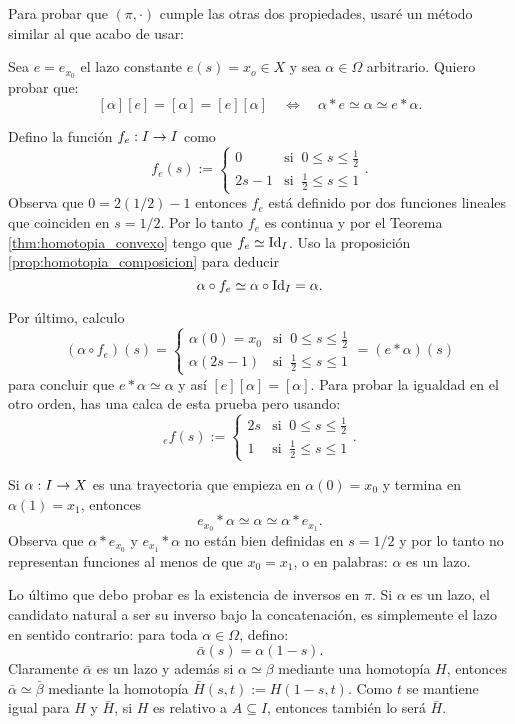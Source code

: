 \documentclass[../../topologia_algebraica]{subfiles}
\begin{document}
Para probar que $(\pi,\cdot)$ cumple las otras dos propiedades, usar\'e un m\'etodo similar
al que acabo de usar:

Sea $e=e_{x_0}$ el lazo constante $e(s)=x_o\in X$ y sea $\alpha\in\Omega$ arbitrario. Quiero
probar que:
\begin{equation}
  \label{eq:existencia_neutro}
  [\alpha][e]=[\alpha]=[e][\alpha] \quad\iff\quad \alpha*e\simeq \alpha \simeq e*\alpha.
\end{equation}

Defino la funci\'on $f_e:I\rightarrow I$ como
\[
  f_e(s):=
  \begin{cases}
    0 & \text{si}\;\; 0\leq s\leq\frac{1}{2}\\
    2s-1 & \text{si}\;\; \frac{1}{2}\leq s\leq 1
  \end{cases}.
\]
Observa que $0=2(1/2)-1$ entonces $f_e$ est\'a definido por dos funciones lineales que
coinciden en $s=1/2$. Por lo tanto $f_e$ es continua y por el Teorema \ref{thm:homotopia_convexo}
tengo que $f_e\simeq \text{Id}_I$. Uso la proposici\'on \ref{prop:homotopia_composicion} para deducir
\[
  \alpha\circ f_e \simeq \alpha\circ\text{Id}_I=\alpha.
\]

Por \'ultimo, calculo
\[
  (\alpha\circ f_e)(s)=
    \begin{cases}
      \alpha(0)=x_0 & \text{si}\;\; 0\leq s\leq \frac{1}{2} \\
      \alpha(2s-1) & \text{si}\;\; \frac{1}{2}\leq s\leq 1
    \end{cases}
  =
  (e*\alpha)(s)
\]
para concluir que $e*\alpha\simeq \alpha$ y as\'i $[e][\alpha]=[\alpha]$. Para probar la
igualdad en el otro orden, has una calca de esta prueba pero usando:
\[
  {}_ef(s):=
  \begin{cases}
    2s & \text{si}\;\; 0\leq s\leq\frac{1}{2}\\
    1 & \text{si}\;\; \frac{1}{2}\leq s\leq 1
  \end{cases}.  
\]

\begin{nota}
  Si $\alpha:I\rightarrow X$ es una trayectoria que empieza en $\alpha(0)=x_0$ y termina en $\alpha(1)=x_1$,
  entonces
  \[
    e_{x_0}*\alpha \simeq \alpha \simeq \alpha*e_{x_1}.
  \]
  Observa que $\alpha*e_{x_0}$ y $e_{x_1}*\alpha$ no est\'an bien definidas en $s=1/2$ y por lo tanto
  no representan funciones al menos de que $x_0=x_1$, o en palabras: $\alpha$ es un lazo.
\end{nota}

Lo \'ultimo que debo probar es la existencia de inversos en $\pi$. Si $\alpha$ es un lazo, el candidato
natural a ser su inverso bajo la concatenaci\'on, es simplemente el lazo en sentido contrario: para
toda $\alpha\in\Omega$, defino:
\[
  \bar{\alpha}(s)=\alpha(1-s).
\]
Claramente $\bar{\alpha}$ es un lazo y adem\'as si $\alpha\simeq\beta$ mediante una homotop\'ia
$H$, entonces $\bar{\alpha}\simeq\bar{\beta}$
mediante la homotop\'ia $\bar{H}(s,t):=H(1-s,t)$. Como $t$ se mantiene igual para $H$ y
$\bar{H}$, si $H$ es relativo a $A\subseteq I$, entonces tambi\'en lo ser\'a $\bar{H}$.
\end{document}
